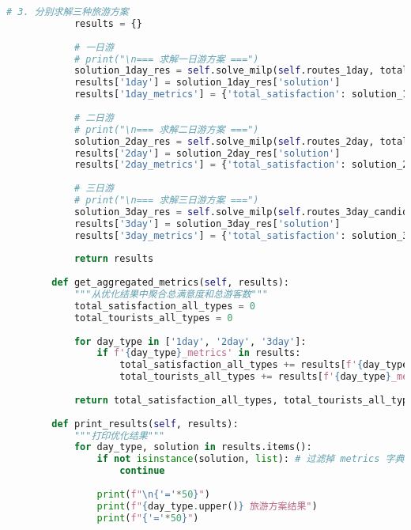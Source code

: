 \begin{lstlisting}[language=Python]
            # 3. 分别求解三种旅游方案
            results = {}
            
            # 一日游
            # print("\n=== 求解一日游方案 ===")
            solution_1day_res = self.solve_milp(self.routes_1day, total_tourists=tourists_1day)
            results['1day'] = solution_1day_res['solution']
            results['1day_metrics'] = {'total_satisfaction': solution_1day_res['total_satisfaction'], 'total_tourists': solution_1day_res['total_tourists']}
            
            # 二日游
            # print("\n=== 求解二日游方案 ===")
            solution_2day_res = self.solve_milp(self.routes_2day, total_tourists=tourists_2day)
            results['2day'] = solution_2day_res['solution']
            results['2day_metrics'] = {'total_satisfaction': solution_2day_res['total_satisfaction'], 'total_tourists': solution_2day_res['total_tourists']}
            
            # 三日游
            # print("\n=== 求解三日游方案 ===")
            solution_3day_res = self.solve_milp(self.routes_3day_candidates, total_tourists=tourists_3day)
            results['3day'] = solution_3day_res['solution']
            results['3day_metrics'] = {'total_satisfaction': solution_3day_res['total_satisfaction'], 'total_tourists': solution_3day_res['total_tourists']}
            
            return results
        
        def get_aggregated_metrics(self, results):
            """从优化结果中聚合总满意度和总游客数"""
            total_satisfaction_all_types = 0
            total_tourists_all_types = 0
    
            for day_type in ['1day', '2day', '3day']:
                if f'{day_type}_metrics' in results:
                    total_satisfaction_all_types += results[f'{day_type}_metrics']['total_satisfaction']
                    total_tourists_all_types += results[f'{day_type}_metrics']['total_tourists']
            
            return total_satisfaction_all_types, total_tourists_all_types
    
        def print_results(self, results):
            """打印优化结果"""
            for day_type, solution in results.items():
                if not isinstance(solution, list): # 过滤掉 metrics 字典
                    continue
    
                print(f"\n{'='*50}")
                print(f"{day_type.upper()} 旅游方案结果")
                print(f"{'='*50}")
                

\end{lstlisting}
